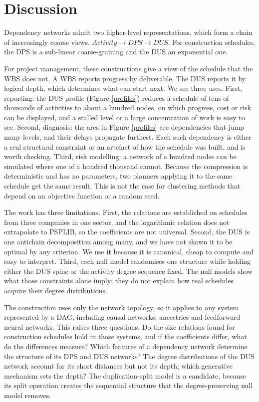 \documentclass[11pt,a4paper]{article}
\begin{document}
\section*{Discussion}

Dependency networks admit two higher-level representations, which form a chain of increasingly coarse views, $\textit{Activity} \to \textit{DPS} \to \textit{DUS}$. For construction schedules, the DPS is a sub-linear coarse-graining and the DUS an exponential one.

For project management, these constructions give a view of the schedule that the WBS does not. A WBS reports progress by deliverable. The DUS reports it by logical depth, which determines what can start next. We see three uses. First, reporting: the DUS profile (Figure \ref{profiles}) reduces a schedule of tens of thousands of activities to about a hundred nodes, on which progress, cost or risk can be displayed, and a stalled level or a large concentration of work is easy to see. Second, diagnosis: the arcs in Figure \ref{profiles} are dependencies that jump many levels, and their delays propagate furthest. Each such dependency is either a real structural constraint or an artefact of how the schedule was built, and is worth checking. Third, risk modelling: a network of a hundred nodes can be simulated where one of a hundred thousand cannot. Because the compression is deterministic and has no parameters, two planners applying it to the same schedule get the same result. This is not the case for clustering methods that depend on an objective function or a random seed.

The work has three limitations. First, the relations are established on schedules from three companies in one sector, and the logarithmic relation does not extrapolate to PSPLIB, so the coefficients are not universal. Second, the DUS is one antichain decomposition among many, and we have not shown it to be optimal by any criterion. We use it because it is canonical, cheap to compute and easy to interpret. Third, each null model randomises one structure while holding either the DUS spine or the activity degree sequence fixed. The null models show what those constraints alone imply; they do not explain how real schedules acquire their degree distributions.

The construction uses only the network topology, so it applies to any system represented by a DAG, including causal networks, ancestries and feedforward neural networks. This raises three questions. Do the size relations found for construction schedules hold in those systems, and if the coefficients differ, what do the differences measure? Which features of a dependency network determine the structure of its DPS and DUS networks? The degree distributions of the DUS network account for its short distances but not its depth; which generative mechanism sets the depth? The duplication-split model \cite{vazquez2023activity} is a candidate, because its split operation creates the sequential structure that the degree-preserving null model removes.
\end{document}
